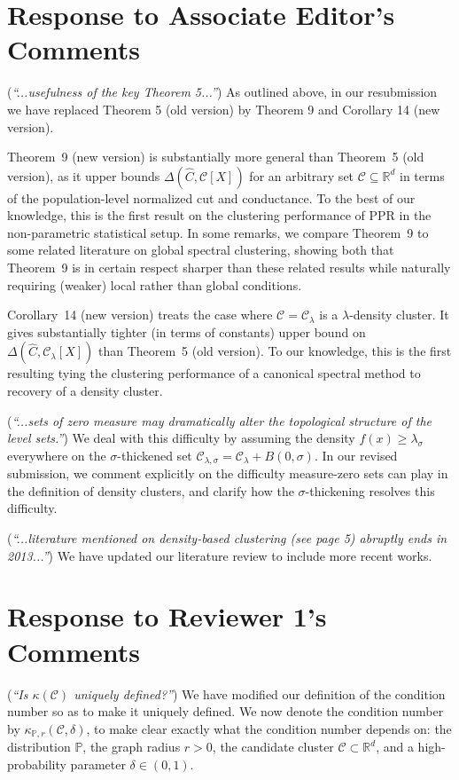 \documentclass{article}
\newcommand{\Reals}{\mathbb{R}}
\newcommand{\1}{\mathbf{1}}
\newcommand{\Rd}{\Reals^d}
\newcommand{\mc}[1]{\mathcal{#1}}
\newcommand{\Pbb}{\mathbb{P}}
\newcommand{\wh}[1]{\widehat{#1}}
\theoremstyle{alden}
\theoremstyle{aldenthm}
\theoremstyle{definition}
\theoremstyle{remark}
\begin{document}
\section{Response to Associate Editor's Comments}

(\textit{``...usefulness of the key Theorem 5...''}) As outlined above, in our resubmission we have replaced Theorem 5 (old version) by Theorem 9 and Corollary 14 (new version). 

Theorem~9 (new version)  is substantially more general than Theorem~5 (old version), as it upper bounds $\Delta(\wh{C},\mc{C}[X])$ for an arbitrary set $\mc{C} \subseteq \Rd$ in terms of the population-level normalized cut and conductance. To the best of our knowledge, this is the first result on the clustering performance of PPR in the non-parametric statistical setup. In some remarks, we compare Theorem~9 to some related literature on global spectral clustering, showing both that Theorem~9 is in certain respect sharper than these related results while naturally requiring (weaker) local rather than global conditions.

Corollary~14 (new version) treats the case where $\mc{C} = \mc{C}_{\lambda}$ is a $\lambda$-density cluster. It gives substantially tighter (in terms of constants) upper bound on $\Delta(\wh{C},\mc{C}_{\lambda}[X])$ than Theorem~5 (old version). To our knowledge, this is the first resulting tying the clustering performance of a canonical spectral method to recovery of a density cluster.

(\textit{``...sets of zero measure may dramatically alter the topological structure of the level sets.''}) We deal with this difficulty by assuming the density $f(x) \geq \lambda_{\sigma}$ everywhere on the $\sigma$-thickened set $\mc{C}_{\lambda,\sigma} = \mc{C}_{\lambda} + B(0,\sigma)$. In our revised submission, we comment explicitly on the difficulty measure-zero sets can play in the definition of density clusters, and clarify how the $\sigma$-thickening resolves this difficulty.

(\textit{``...literature mentioned on density-based clustering (see page 5) abruptly ends in 2013...''}) We have updated our literature review to include more recent works.

\section{Response to Reviewer 1's Comments}

(\textit{``Is $\kappa(\mc{C})$ uniquely defined?''}) We have modified our definition of the condition number so as to make it uniquely defined. We now denote the condition number by $\kappa_{\Pbb,r}(\mc{C},\delta)$, to make clear exactly what the condition number depends on: the distribution $\Pbb$, the graph radius $r > 0$, the candidate cluster $\mc{C} \subset \Rd$, and a high-probability parameter $\delta \in (0,1)$. 
\end{document}

